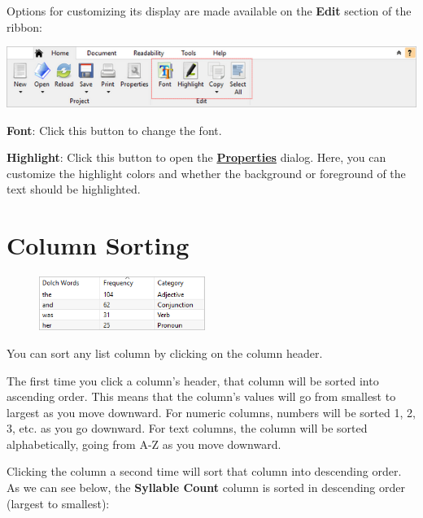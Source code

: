 \documentclass[
]{book}
\theoremstyle{definition}
\theoremstyle{definition}
\theoremstyle{definition}
\theoremstyle{definition}
\theoremstyle{remark}
\begin{document}
Options for customizing its display are made available on the \textbf{Edit} section of the ribbon:

\includegraphics{Images/RibbonEditTextWindow.png}

\textbf{Font}: Click this button to change the font.

\textbf{Highlight}: Click this button to open the \protect\hyperlink{options-highlighted-reports}{\textbf{Properties}} dialog. Here, you can customize the highlight colors and whether the background or foreground of the text should be highlighted.

\hypertarget{column-sorting}{%
\section{Column Sorting}\label{column-sorting}}

\begin{figure}
\includegraphics[width=0.48\textwidth,height=\textheight]{Images/columnheader.png}

\end{figure}

You can sort any list column by clicking on the column header.

The first time you click a column's header, that column will be sorted into ascending order. This means that the column's values will go from smallest to largest as you move downward. For numeric columns, numbers will be sorted 1, 2, 3, etc. as you go downward. For text columns, the column will be sorted alphabetically, going from A-Z as you move downward.

Clicking the column a second time will sort that column into descending order. As we can see below, the \textbf{Syllable Count} column is sorted in descending order (largest to smallest):
\end{document}
